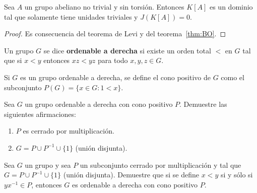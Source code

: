 \begin{corollary}
	Sea $A$ un grupo abeliano no trivial y sin torsión. Entonces $K[A]$ es un
	dominio tal que solamente tiene unidades triviales y $J(K[A])=0$. 
\end{corollary}

\begin{proof}
	Es consecuencia del teorema de Levi y del teorema~\ref{thm:BO}.
\end{proof}

\begin{definition}
	Un grupo $G$ se dice \textbf{ordenable a derecha} si existe un orden total
	$<$ en $G$ tal que si $x<y$ entonces $xz<yz$ para todo $x,y,z\in G$.
\end{definition}

%
%	

Si $G$ es un grupo ordenable a derecha, se define el cono positivo de $G$ como
el subconjunto $P(G)=\{x\in G:1<x\}$. 

\begin{exercise}
	Sea $G$ un grupo ordenable a derecha con cono positivo $P$. Demuestre las
	siguientes afirmaciones:
	\begin{enumerate}
		\item $P$ es cerrado por multiplicación.
		\item $G=P\cup P^{-1}\cup \{1\}$ (unión disjunta).
	\end{enumerate}
\end{exercise}

\begin{exercise}
	Sea $G$ un grupo y sea $P$ un subconjunto cerrado por multiplicación y tal
	que $G=P\cup P^{-1}\cup \{1\}$ (unión disjunta). Demuestre que si se define $x<y$ si y
	sólo si $yx^{-1}\in P$, entonces $G$ es ordenable a derecha con cono
	positivo $P$.
\end{exercise}

